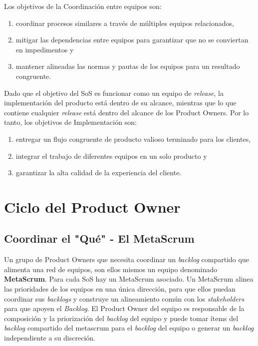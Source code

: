 \documentclass{article} %
\begin{document}
\noindent 

\noindent Los objetivos de la Coordinaci\'{o}n entre equipos son:

\begin{enumerate}
\item  coordinar procesos similares a trav\'{e}s de m\'{u}ltiples equipos relacionados,

\item  mitigar las dependencias entre equipos para garantizar que no se conviertan en impedimentos y

\item  mantener alineadas las normas y pautas de los equipos para un resultado congruente.
\end{enumerate}

\noindent Dado que el objetivo del SoS es funcionar como un equipo de \textit{release}, la implementaci\'{o}n del producto est\'{a} dentro de su alcance, mientras que lo que contiene cualquier \textit{release }est\'{a} dentro del alcance de los Product Owners. Por lo tanto, los objetivos de Implementaci\'{o}n son:

\begin{enumerate}
\item  entregar un flujo congruente de producto valioso terminado para los clientes,

\item  integrar el trabajo de diferentes equipos en un solo producto y

\item  garantizar la alta calidad de la experiencia del cliente.
\end{enumerate}

\noindent 

\noindent 

\noindent 

\noindent 

\noindent 
\section{Ciclo del Product Owner}

\noindent 
\subsection{Coordinar el "Qu\'{e}" -  El MetaScrum}

\noindent 

\noindent Un grupo de Product Owners que necesita coordinar un \textit{backlog }compartido\textit{ }que alimenta una red de equipos, son ellos mismos un equipo denominado \textbf{MetaScrum}. Para cada SoS hay un MetaScrum asociado. Un MetaScrum alinea las prioridades de los equipos en una \'{u}nica direcci\'{o}n, para que ellos puedan coordinar sus \textit{backlogs }y construye un alineamiento com\'{u}n con los \textit{stakeholders }para que apoyen el \textit{Backlog}.  El Product Owner del equipo  es responsable de la composici\'{o}n y la priorizaci\'{o}n del \textit{backlog }del equipo y puede tomar \'{i}tems del \textit{backlog }compartido del metascrum para el \textit{backlog }del equipo o generar un \textit{backlog }independiente a su discreci\'{o}n.
\end{document}
